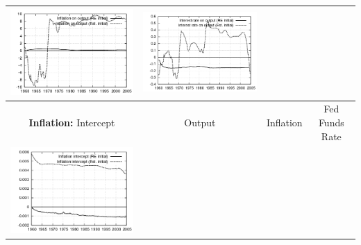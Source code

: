 \documentclass{beamer}
\begin{document}
{\begin{tabular}{|cccc|}
  \includegraphics[scale=0.17]{plots2/initest_Inflation_on_output.png} & 
  \includegraphics[scale=0.17]{plots2/initest_Interest_rate_on_output.png} \\ \hline
  \small{\textbf{Inflation:} Intercept} & \small{Output} & \small{Inflation} & \small{Fed Funds Rate} \\ \hline
  \includegraphics[scale=0.17]{plots2/initest_Inflation_intercept.png} &

\end{tabular}}
\end{document}

